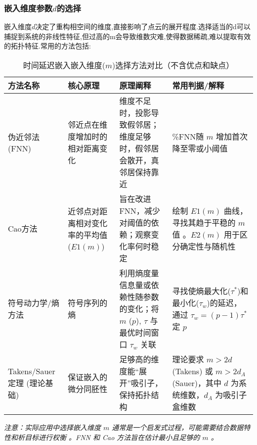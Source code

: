 \subsubsection{嵌入维度参数\(d\)的选择}
嵌入维度\(d\)决定了重构相空间的维度,直接影响了点云的展开程度.选择适当的d可以捕捉到系统的非线性特征,但过高的m会导致维数灾难,使得数据稀疏,难以提取有效的拓扑特征.常用的方法包括:

\begin{table}[h!] %
    \centering %
    \caption{时间延迟嵌入嵌入维度($m$)选择方法对比（不含优点和缺点）}
    \label{tab:embedding_dimension_methods_no_pros_cons}
    \begin{tabular}{
      >{\raggedright\arraybackslash}m{3cm} %
      >{\raggedright\arraybackslash}m{4.5cm} %
      >{\raggedright\arraybackslash}m{5cm}  %
      >{\raggedright\arraybackslash}m{4cm}  %
    }
    \toprule %
    \textbf{方法名称} & \textbf{核心原理}  & \textbf{原理阐释}  & \textbf{常用判据/解释} \\
    \midrule %
    
    伪近邻法 (FNN) & 邻近点在维度增加时的相对距离变化  & 维度不足时，投影导致假邻居；维度足够时，假邻居会散开，真邻居保持靠近  & \%FNN随 $m$ 增加首次降至零或小阈值  \\
    \addlinespace %
    
    Cao方法 & 近邻点对距离相对变化率的平均值 ($E1(m)$)  & 旨在改进FNN，减少对阈值的依赖；观察变化率何时稳定  & 绘制 $E1(m)$ 曲线，寻找其趋于平稳的 $m$ 值 。$E2(m)$ 用于区分确定性与随机性  \\
    \addlinespace
    
    符号动力学/熵方法 & 符号序列的熵  & 利用熵度量信息量或依赖性随参数的变化；将 $m$ ($p$), $τ$ 与最优时间窗口 $\tau_w$ 关联  & 寻找使熵最大化($\tau^*$)和最小化($\tau_w$)的延迟，通过 $\tau_w=(p-1)\tau^*$ 定 $p$  \\
    \addlinespace
    
    Takens/Sauer 定理 (理论基础) & 保证嵌入的微分同胚性  & 足够高的维度能“展开”吸引子，保持拓扑结构  & 理论要求 $m > 2d$ (Takens) 或 $m > 2d_A$ (Sauer)，其中 $d$ 为系统维数，$d_A$ 为吸引子盒维数 \\
    
    \bottomrule %
    \end{tabular}
    \par %
    \vspace{0.5cm} %
    \textit{注意：实际应用中选择嵌入维度 $m$ 通常是一个启发式过程，可能需要结合数据特性和析目标进行权衡 。FNN 和 Cao 方法旨在估计最小且足够的 $m$ 。}
    \end{table}
    
